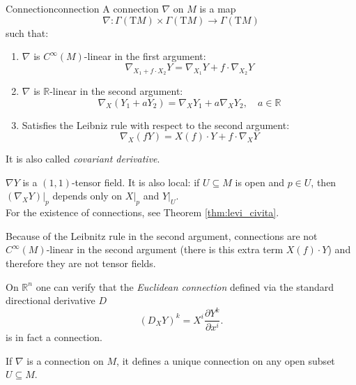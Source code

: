 \begin{colordef}{Connection}{connection}
A connection $\nabla$ on $M$ is a map
$$\nabla \colon \Gamma(\mathrm{T}M) \times \Gamma(\mathrm{T}M) \to \Gamma(\mathrm{T}M)$$
such that:
\begin{enumerate}
    \item $\nabla$ is $C^\infty(M)$-linear in the first argument:
    \[
    \nabla_{X_1 + f \cdot X_2} Y = \nabla_{X_1} Y + f \cdot \nabla_{X_2} Y
    \]
    \item $\nabla$ is $\mathbb{R}$-linear in the second argument:
    \[
    \nabla_X (Y_1 + a Y_2) = \nabla_X Y_1 + a \nabla_X Y_2, \quad a \in \mathbb{R}
    \]
    \item Satisfies the Leibniz rule with respect to the second argument:
    \[
    \nabla_X (f Y) = X(f) \cdot Y + f \cdot \nabla_X Y
    \]
\end{enumerate}
It is also called \emph{covariant derivative}.
\end{colordef}

$\nabla Y$ is a $(1,1)$-tensor field. It is also local: if $U \subseteq M$ is open and $p \in U$, then $(\nabla_X Y)|_p$ depends only on $X|_p$ and $Y|_U$.\\

For the existence of connections, see Theorem \ref{thm:levi_civita}.

Because of the Leibnitz rule in the second argument, connections are not $C^\infty(M)$-linear in the second argument (there is this extra term $X(f)\cdot Y$) and therefore they are not tensor fields.

On $\mathbb{R}^n$ one can verify that the \emph{Euclidean connection} defined via the standard directional derivative $D$
\begin{equation}
    \label{eq:connection_Rn}
    (D_X Y)^k = X^i \frac{\partial Y^k}{\partial x^i}.
\end{equation}
is in fact a connection.

\begin{colorlem}{}{}
If $\nabla$ is a connection on $M$, it defines a unique connection on any open subset $U \subseteq M$.
\end{colorlem}


